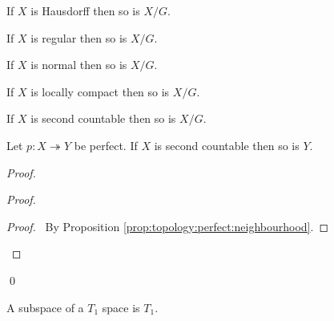 \begin{cor}
 If $X$ is Hausdorff then so is $X / G$.
\end{cor}

\begin{cor}
 If $X$ is regular then so is $X / G$.
\end{cor}

\begin{cor}
 If $X$ is normal then so is $X / G$.
\end{cor}

\begin{cor}
  If $X$ is locally compact then so is $X / G$.
\end{cor}

\begin{cor}
 If $X$ is second countable then so is $X / G$.
\end{cor}

\begin{prop}
 Let $p : X \twoheadrightarrow Y$ be perfect. If $X$ is second countable then
so is $Y$.
\end{prop}

\begin{proof}
 \pf
 \begin{proof}
   \begin{proof}
     \pf\ By Proposition \ref{prop:topology:perfect:neighbourhood}.
   \end{proof}
 \end{proof}
 \qed
\end{proof}

\begin{prop}
 A subspace of a $T_1$ space is $T_1$.
\end{prop}

